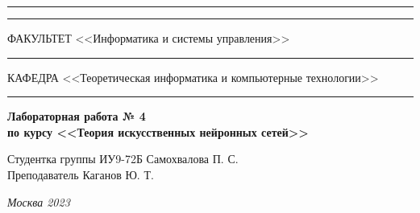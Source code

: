 \documentclass[a4paper, 14pt]{extarticle}
\begin{document}
\begin{titlepage}
\vspace{-25pt}
\hspace{-35pt}\rule{\textwidth}{2.3pt}

\vspace*{-20.3pt}
\hspace{-35pt}\rule{\textwidth}{0.4pt}

\vspace{1.5ex}
\hspace{-35pt} \noindent \small ФАКУЛЬТЕТ\hspace{80pt} <<Информатика и системы управления>>

\vspace*{-16pt}
\hspace{47pt}\rule{0.83\textwidth}{0.4pt}

\vspace{0.5ex}
\hspace{-35pt} \noindent \small КАФЕДРА\hspace{50pt} <<Теоретическая информатика и компьютерные технологии>>

\vspace*{-16pt}
\hspace{30pt}\rule{0.866\textwidth}{0.4pt}
  
\vspace{11em}

\begin{center}
\Large {\bf Лабораторная работа № 4} \\
\large {\bf по курсу <<Теория искусственных нейронных сетей>>} \\
\end{center}\normalsize

\vspace{8em}


\begin{flushright}
  {Студентка группы ИУ9-72Б Самохвалова П. С. \hspace*{15pt}\\
  \vspace{2ex}
  Преподаватель Каганов Ю. Т.\hspace*{15pt}}
\end{flushright}

\bigskip

\vfill
 

\begin{center}
\textsl{Москва 2023}
\end{center}
\end{titlepage}
\end{document}
